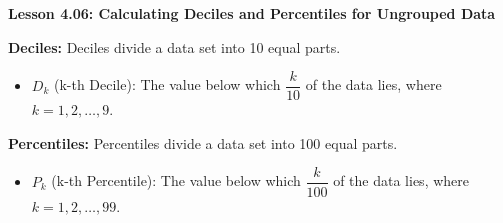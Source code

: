 \begin{center}
\textbf{Lesson 4.06: Calculating Deciles and Percentiles for Ungrouped Data}
\end{center}

\vspace*{-1.5ex}

\noindent \textbf{Deciles:} Deciles divide a data set into 10 equal parts.  
        \begin{itemize}
            \item \(D_k\) (k-th Decile): The value below which \(\dfrac{k}{10}\) of the data lies, where \(k = 1, 2, \ldots, 9\).
        \end{itemize}

\noindent \textbf{Percentiles:} Percentiles divide a data set into 100 equal parts.  
        \begin{itemize}
            \item \(P_k\) (k-th Percentile): The value below which \(\dfrac{k}{100}\) of the data lies, where \(k = 1, 2, \ldots, 99\).
        \end{itemize}



  


